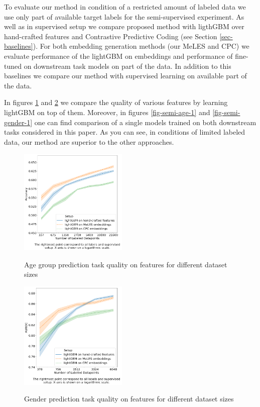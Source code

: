 \documentclass[sigconf, anonymous]{acmart}
\begin{document}
To evaluate our method in condition of a restricted amount of labeled data we use only part of available target labels for the semi-supervised experiment.
As well as in supervised setup we compare proposed method with ligthGBM over hand-crafted features and Contrastive Predictive Coding (see Section \ref{sec-baselines}).
For both embedding generation methods (our MeLES and CPC) we evaluate performance of the lightGBM on embeddings and performance of fine-tuned on downstream task models on part of the data.
In addition to this baselines we compare our method with supervised learning on available part of the data.

In figures \ref{fig-semi-age-0} and \ref{fig-semi-gender-0} we compare the quality of various features by learning lightGBM on top of them. Moreover, in figures \ref{fig-semi-age-1} and \ref{fig-semi-gender-1} one can find comparison of a single models trained on both downstream tasks considered in this paper. As you can see, in conditions of limited labeled data, our method are superior to the other approaches.

\begin{figure}[ht]
  \caption{Age group prediction task quality on features for different dataset sizes}
  \includegraphics[width=0.46\textwidth]{figures/ss_age_0.png}
  \label{fig-semi-age-0}
\end{figure}

\begin{figure}[ht]
  \caption{Gender prediction task quality on features for different dataset sizes}
  \includegraphics[width=0.46\textwidth]{figures/ss_gen_0.png}
  \label{fig-semi-gender-0}
\end{figure}
\end{document}
